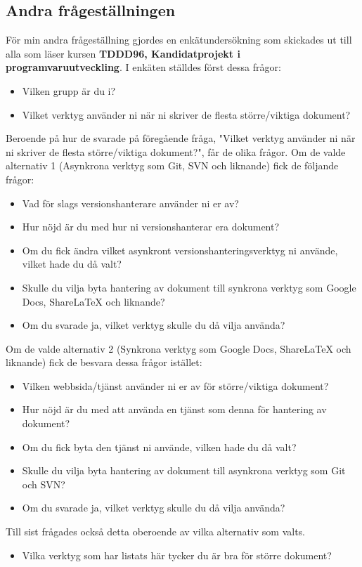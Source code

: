 \subsection{Andra frågeställningen}
För min andra frågeställning gjordes en enkätundersökning som skickades ut till alla som läser kursen \textbf{TDDD96, Kandidatprojekt i programvaruutveckling}. I enkäten ställdes först dessa frågor:
\begin{itemize}
	\item Vilken grupp är du i?
	\item Vilket verktyg använder ni när ni skriver de flesta större/viktiga dokument?
\end{itemize}
Beroende på hur de svarade på föregående fråga, "Vilket verktyg använder ni när ni skriver de flesta större/viktiga dokument?", får de olika frågor. Om de valde alternativ 1 (Asynkrona verktyg som Git, SVN och liknande) fick de följande frågor:
\begin{itemize}
	\item Vad för slags versionshanterare använder ni er av?
	\item Hur nöjd är du med hur ni versionshanterar era dokument?
	\item Om du fick ändra vilket asynkront versionshanteringsverktyg ni använde, vilket hade du då valt?
	\item Skulle du vilja byta hantering av dokument till synkrona verktyg som Google Docs, ShareLaTeX och liknande?
	\item Om du svarade ja, vilket verktyg skulle du då vilja använda?
\end{itemize}
Om de valde alternativ 2 (Synkrona verktyg som Google Docs, ShareLaTeX och liknande) fick de besvara dessa frågor istället:
\begin{itemize}
	\item Vilken webbsida/tjänst använder ni er av för större/viktiga dokument?
	\item Hur nöjd är du med att använda en tjänst som denna för hantering av dokument?
	\item Om du fick byta den tjänst ni använde, vilken hade du då valt?
	\item Skulle du vilja byta hantering av dokument till asynkrona verktyg som Git och SVN?
	\item Om du svarade ja, vilket verktyg skulle du då vilja använda?
\end{itemize}
Till sist frågades också detta oberoende av vilka alternativ som valts.
\begin{itemize}
	\item Vilka verktyg som har listats här tycker du är bra för större dokument?
\end{itemize}

